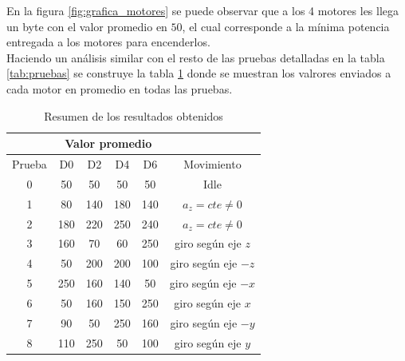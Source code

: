 \documentclass[spanish,12pt,a4paper,titlepage]{report}
\begin{document}
En la figura \ref{fig:grafica_motores} se puede observar que a los 4 motores les llega un byte con el valor promedio en $50$, el cual corresponde a la mínima potencia entregada a los motores para encenderlos.\\

Haciendo un análisis similar con el resto de las pruebas detalladas en la tabla \ref{tab:pruebas} se construye la tabla \ref{tab:resumen_snif} donde se muestran los valrores enviados a cada motor en promedio en todas las pruebas.\\

\begin{table}[H]
\begin{center}
\begin{tabular}{c|c|c|c|c|c|} 
\cline{2-5}
& \multicolumn{4}{c|}{\cellcolor[gray]{0.8} Valor promedio} \\ \hline
\multicolumn{1}{|c|}{\cellcolor[gray]{0.8} Prueba} & \cellcolor[gray]{0.8} D0 & \cellcolor[gray]{0.8} D2 & \cellcolor[gray]{0.8} D4 & \cellcolor[gray]{0.8} D6 & \cellcolor[gray]{0.8} Movimiento \\ \hline
\multicolumn{1}{|c|}{\cellcolor[gray]{0.8}0} & 50 & 50 & 50 & 50 & Idle \\ \hline
\multicolumn{1}{|c|}{\cellcolor[gray]{0.8}1} & 80 & 140 & 180 & 140 & $a_z=cte\neq 0$\\ \hline
\multicolumn{1}{|c|}{\cellcolor[gray]{0.8}2} & 180 & 220 & 250 & 240 & $a_z=cte\neq 0$ \\ \hline \hline
\multicolumn{1}{|c|}{\cellcolor[gray]{0.8}3} & 160 & 70 & 60 & 250 & giro según eje $z$ \\ \hline
\multicolumn{1}{|c|}{\cellcolor[gray]{0.8}4} & 50 & 200 & 200 & 100 & giro según eje $-z$\\ \hline \hline
\multicolumn{1}{|c|}{\cellcolor[gray]{0.8}5} & 250 & 160 & 140 & 50 & giro según eje $-x$\\ \hline
\multicolumn{1}{|c|}{\cellcolor[gray]{0.8}6} & 50 & 160 & 150 & 250 & giro según eje $x$ \\ \hline
\multicolumn{1}{|c|}{\cellcolor[gray]{0.8}7} & 90 & 50 & 250 & 160 & giro según eje $-y$\\ \hline
\multicolumn{1}{|c|}{\cellcolor[gray]{0.8}8} & 110 & 250 & 50 &  100 & giro según eje $y$\\ \hline
\end{tabular} 
\caption{Resumen de los resultados obtenidos}
\label{tab:resumen_snif}
\end{center}
\end{table}
\end{document}
